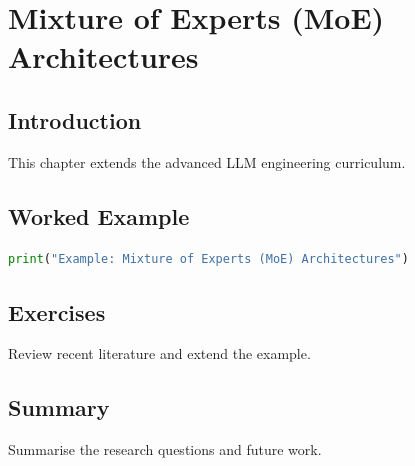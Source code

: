 \chapter{Mixture of Experts (MoE) Architectures}
\label{chap:vol13-6}



\section{Introduction}
This chapter extends the advanced LLM engineering curriculum.

\section{Worked Example}
\begin{lstlisting}[language=Python]
print("Example: Mixture of Experts (MoE) Architectures")
\end{lstlisting}

\section{Exercises}
\begin{exercise}
Review recent literature and extend the example.
\end{exercise}

\section{Summary}
Summarise the research questions and future work.
